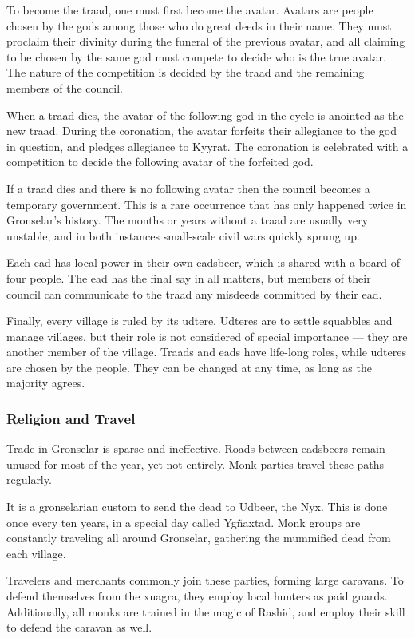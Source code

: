 To become the traad, one must first become the avatar.
Avatars are people chosen by the gods among those who do great deeds in their name.
They must proclaim their divinity during the funeral of the previous avatar, and all claiming to be chosen by the same god must compete to decide who is the true avatar.
The nature of the competition is decided by the traad and the remaining members of the council.

When a traad dies, the avatar of the following god in the cycle is anointed as the new traad.
During the coronation, the avatar forfeits their allegiance to the god in question, and pledges allegiance to Kyyrat.
The coronation is celebrated with a competition to decide the following avatar of the forfeited god.

If a traad dies and there is no following avatar then the council becomes a temporary government.
This is a rare occurrence that has only happened twice in Gronselar's history.
The months or years without a traad are usually very unstable, and in both instances small-scale civil wars quickly sprung up.

Each ead has local power in their own eadsbeer, which is shared with a board of four people.
The ead has the final say in all matters, but members of their council can communicate to the traad any misdeeds committed by their ead.

Finally, every village is ruled by its udtere.
Udteres are to settle squabbles and manage villages, but their role is not considered of special importance --- they are another member of the village.
Traads and eads have life-long roles, while udteres are chosen by the people.
They can be changed at any time, as long as the majority agrees.

\subsubsection{Religion and Travel}
Trade in Gronselar is sparse and ineffective.
Roads between eadsbeers remain unused for most of the year, yet not entirely.
Monk parties travel these paths regularly.

It is a gronselarian custom to send the dead to Udbeer, the Nyx.
This is done once every ten years, in a special day called Yg\~naxtad.
Monk groups are constantly traveling all around Gronselar, gathering the mummified dead from each village.

Travelers and merchants commonly join these parties, forming large caravans.
To defend themselves from the xuagra, they employ local hunters as paid guards.
Additionally, all monks are trained in the magic of Rashid, and employ their skill to defend the caravan as well.

